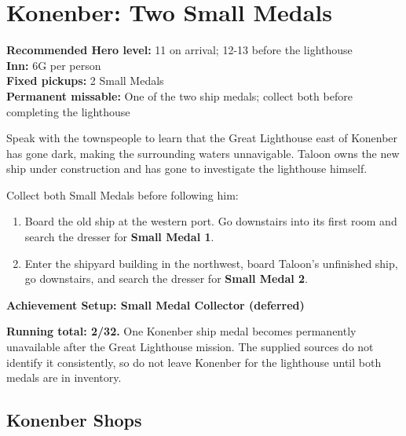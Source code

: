 \documentclass[
  american,
  10pt,
  letterpaper,
  oneside,
  open=any]{scrreprt}
\providecommand{\tightlist}{%
  \setlength{\itemsep}{0pt}\setlength{\parskip}{0pt}}
\begin{document}
\section{Konenber: Two Small Medals}\label{konenber-two-small-medals}

\textbf{Recommended Hero level:} 11 on arrival; 12-13 before the
lighthouse\\
\textbf{Inn:} 6G per person\\
\textbf{Fixed pickups:} 2 Small Medals\\
\textbf{Permanent missable:} One of the two ship medals; collect both
before completing the lighthouse

Speak with the townspeople to learn that the Great Lighthouse east of
Konenber has gone dark, making the surrounding waters unnavigable.
Taloon owns the new ship under construction and has gone to investigate
the lighthouse himself.

Collect both Small Medals before following him:

\begin{enumerate}
\def\labelenumi{\arabic{enumi}.}
\tightlist
\item
  Board the old ship at the western port. Go downstairs into its first
  room and search the dresser for \textbf{Small Medal 1}.
\item
  Enter the shipyard building in the northwest, board Taloon's
  unfinished ship, go downstairs, and search the dresser for
  \textbf{Small Medal 2}.
\end{enumerate}

\begin{achievementsetup}

\textbf{Achievement Setup: Small Medal Collector (deferred)}

\textbf{Running total: 2/32.} One Konenber ship medal becomes
permanently unavailable after the Great Lighthouse mission. The supplied
sources do not identify it consistently, so do not leave Konenber for
the lighthouse until both medals are in inventory.

\end{achievementsetup}

\subsection{Konenber Shops}\label{konenber-shops}
\end{document}
